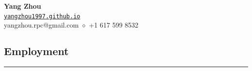 \documentclass[letterpaper, 11pt]{article}
\begin{document}
\begin{center}
{\huge \bf Yang Zhou}\\
\vspace{0.3cm}
\noindent \href{https://yangzhou1997.github.io}{\texttt{yangzhou1997.github.io}}\\
\noindent yangzhou.rpc@gmail.com $\diamond$ +1 617 599 8532\\
\end{center}
\vspace*{0.05cm}



\subsection*{\sc Employment}
\hrule
\vspace{0.2cm}
\end{document}

